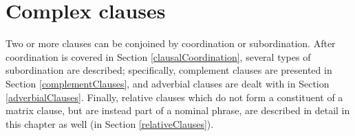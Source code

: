 



\chapter{Complex clauses}\label{complexClauses}%
Two or more clauses can be conjoined by coordination or subordination. %
After coordination is covered in Section \ref{clausalCoordination}, several types of subordination are described; specifically, complement clauses are presented in Section \ref{complementClauses}, and adverbial clauses are dealt with in Section \ref{adverbialClauses}. 
Finally, relative clauses which do not form a constituent of a matrix clause, but are instead part of a nominal phrase, are described in detail in this chapter as well (in Section \ref{relativeClauses}). 

